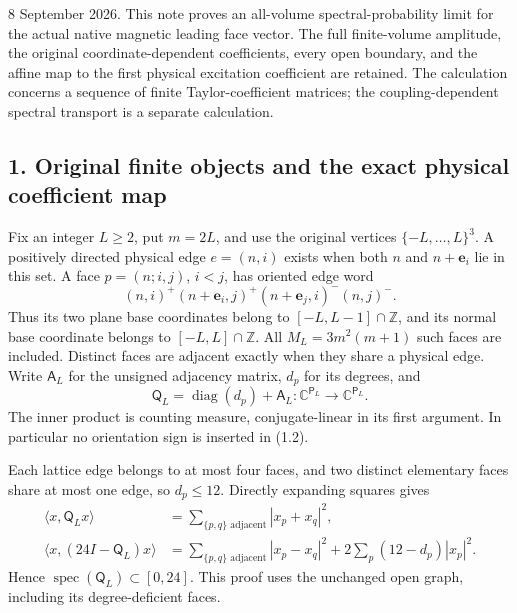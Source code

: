 \documentclass[
  11pt,
]{article}
\begin{document}
8 September 2026. This note proves an all-volume spectral-probability
limit for the actual native magnetic leading face vector. The full
finite-volume amplitude, the original coordinate-dependent coefficients,
every open boundary, and the affine map to the first physical excitation
coefficient are retained. The calculation concerns a sequence of finite
Taylor-coefficient matrices; the coupling-dependent spectral transport
is a separate calculation.

\subsection{1. Original finite objects and the exact physical
coefficient
map}\label{magnetic-part-8-original-finite-objects-and-the-exact-physical-coefficient-map}

Fix an integer \(L\ge2\), put \(m=2L\), and use the original vertices
\(\{-L,\ldots,L\}^3\). A positively directed physical edge \(e=(n,i)\)
exists when both \(n\) and \(n+\mathbf e_i\) lie in this set. A face
\(p=(n;i,j)\), \(i<j\), has oriented edge word \[
(n,i)^+(n+\mathbf e_i,j)^+(n+\mathbf e_j,i)^-(n,j)^-.
\tag{1.1}
\] Thus its two plane base coordinates belong to
\([-L,L-1]\cap\mathbb Z\), and its normal base coordinate belongs to
\([-L,L]\cap\mathbb Z\). All \(M_L=3m^2(m+1)\) such faces are included.
Distinct faces are adjacent exactly when they share a physical edge.
Write \(\mathsf A_L\) for the unsigned adjacency matrix, \(d_p\) for its
degrees, and \[
\mathsf Q_L=\operatorname{diag}(d_p)+\mathsf A_L
  :\mathbb C^{\mathsf P_L}\longrightarrow\mathbb C^{\mathsf P_L}.
\tag{1.2}
\] The inner product is counting measure, conjugate-linear in its first
argument. In particular no orientation sign is inserted in (1.2).

Each lattice edge belongs to at most four faces, and two distinct
elementary faces share at most one edge, so \(d_p\le12\). Directly
expanding squares gives \[
\begin{split}
\langle x,\mathsf Q_Lx\rangle
 &=\sum_{\{p,q\}\text{ adjacent}}|x_p+x_q|^2,\\
\langle x,(24I-\mathsf Q_L)x\rangle
 &=\sum_{\{p,q\}\text{ adjacent}}|x_p-x_q|^2
   +2\sum_p(12-d_p)|x_p|^2.
\end{split}
\tag{1.3}
\] Hence \(\operatorname{spec}(\mathsf Q_L)\subset[0,24]\). This proof
uses the unchanged open graph, including its degree-deficient faces.
\end{document}
